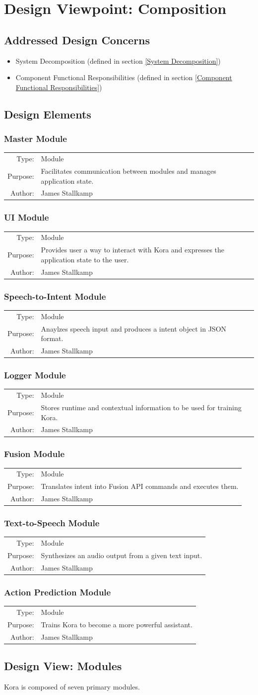 \documentclass[onecolumn, draftclsnofoot,10pt, compsoc]{IEEEtran}
\def \botname{Kora\xspace}
\newcommand{\designConcernRef}[1]{
    #1 (defined in section \ref{#1})
}
\newcommand{\designElementDef}[4]{
    \subsubsection{#1}\label{#1}
        \begin{tabular}[t]{r p{6in}}
            Type: & #2 \\
            Purpose: & #3 \\
            Author: & #4 \\
        \end{tabular}
}
\begin{document}
\section{Design Viewpoint: Composition}
    \subsection{Addressed Design Concerns}
        \begin{itemize}
            \item \designConcernRef{System Decomposition}
            \item \designConcernRef{Component Functional Responsibilities}
        \end{itemize}

    \subsection{Design Elements} 
        \designElementDef{Master Module}
                         {Module}
                         {Facilitates communication between modules and manages application state.}
                         {James Stallkamp}
        \designElementDef{UI Module}
                         {Module}
                         {Provides user a way to interact with \botname and expresses the application state to the user.}
                         {James Stallkamp}
        \designElementDef{Speech-to-Intent Module}
                         {Module}
                         {Anaylzes speech input and produces a intent object in JSON format.}
                         {James Stallkamp}
        \designElementDef{Logger Module}
                         {Module}
                         {Stores runtime and contextual information to be used for training \botname.}
                         {James Stallkamp}
        \designElementDef{Fusion Module}
                         {Module}
                         {Translates intent into Fusion API commands and executes them.}
                         {James Stallkamp}
        \designElementDef{Text-to-Speech Module}
                         {Module}
                         {Synthesizes an audio output from a given text input.}
                         {James Stallkamp}
        \designElementDef{Action Prediction Module}
                         {Module}
                         {Trains \botname to become a more powerful assistant.}
                         {James Stallkamp}
						 
    \subsection{Design View: Modules}
		\botname is composed of seven primary modules.
\end{document}
